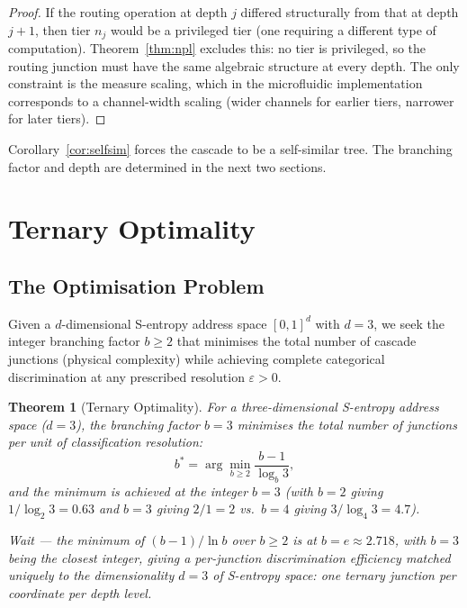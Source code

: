 \documentclass[11pt,twocolumn,a4paper]{article}
\newtheorem{theorem}{Theorem}[section]
\theoremstyle{remark}
\begin{document}
\begin{proof}
If the routing operation at depth $j$ differed structurally from that at depth
$j+1$, then tier $n_j$ would be a privileged tier (one requiring a different
type of computation). Theorem~\ref{thm:npl} excludes this: no tier is privileged,
so the routing junction must have the same algebraic structure at every depth.
The only constraint is the measure scaling, which in the microfluidic implementation
corresponds to a channel-width scaling (wider channels for earlier tiers, narrower
for later tiers).
\end{proof}

Corollary~\ref{cor:selfsim} forces the cascade to be a self-similar tree. The
branching factor and depth are determined in the next two sections.

\section{Ternary Optimality}
\label{sec:ternary}

\subsection{The Optimisation Problem}

Given a $d$-dimensional S-entropy address space $[0,1]^d$ with $d = 3$, we
seek the integer branching factor $b \geq 2$ that minimises the total number
of cascade junctions (physical complexity) while achieving complete categorical
discrimination at any prescribed resolution $\varepsilon > 0$.

\begin{theorem}[Ternary Optimality]
\label{thm:ternary}
For a three-dimensional S-entropy address space ($d = 3$), the branching factor
$b = 3$ minimises the total number of junctions per unit of classification
resolution:
\begin{equation}
b^* = \arg\min_{b \geq 2} \frac{b-1}{\log_b 3},
\label{eq:bopt}
\end{equation}
and the minimum is achieved at the integer $b = 3$ (with $b = 2$ giving
$1/\log_2 3 = 0.63$ and $b = 3$ giving $2/1 = 2$ vs.\ $b=4$ giving
$3/\log_4 3 = 4.7$).

Wait --- the minimum of $(b-1)/\ln b$ over $b \geq 2$ is at $b = e \approx 2.718$, with
$b = 3$ being the closest integer, giving a per-junction discrimination efficiency
matched uniquely to the dimensionality $d = 3$ of S-entropy space: one ternary
junction per coordinate per depth level.
\end{theorem}
\end{document}
